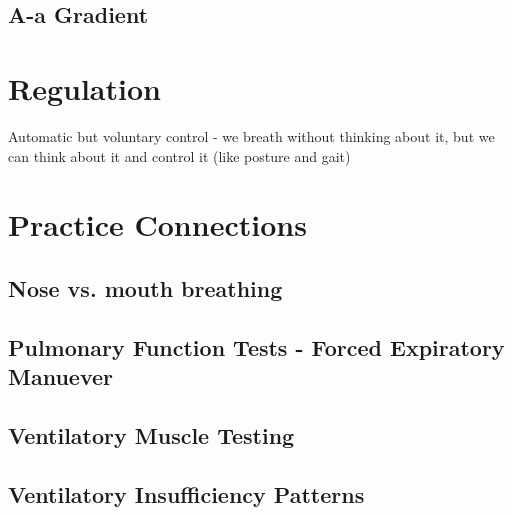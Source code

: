 \subsection{A-a Gradient}


\section{Regulation}

Automatic but voluntary control - we breath without thinking about it, but we can think about it and control it (like posture and gait)



\section{Practice Connections}

\subsection{Nose vs. mouth breathing}

\subsection{Pulmonary Function Tests - Forced Expiratory Manuever}

\subsection{Ventilatory Muscle Testing}

\subsection{Ventilatory Insufficiency Patterns}

\printbibliography[heading=subbibintoc]